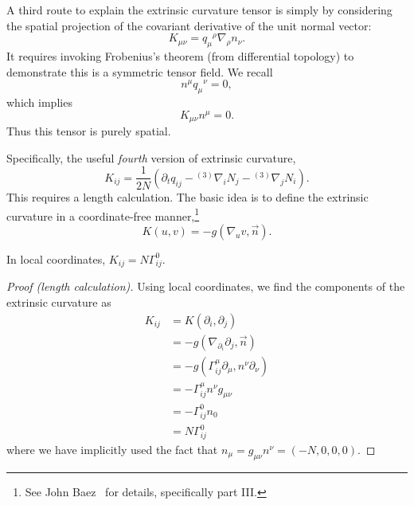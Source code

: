 A third route to explain the extrinsic curvature tensor is simply by
considering the spatial projection of the covariant derivative of the unit
normal vector:
\begin{equation}
K_{\mu\nu} = {q_{\mu}}^{\rho}\nabla_{\rho}n_{\nu}.
\end{equation}
It requires invoking Frobenius's theorem (from differential topology) to
demonstrate this is a symmetric tensor field. We recall
\begin{equation}
n^{\mu}{q_{\mu}}^{\nu} = 0,
\end{equation}
which implies
\begin{equation}
K_{\mu\nu}n^{\mu} = 0.
\end{equation}
Thus this tensor is purely spatial.

Specifically, the useful \emph{fourth} version of extrinsic curvature,
\begin{equation}\label{eq:extrinsic-curvature:as-time-derivative-of-three-metric}
K_{ij} = \frac{1}{2N}(\partial_{t}q_{ij} - {{}^{(3)}}\nabla_{i}N_{j} - {{}^{(3)}}\nabla_{j}N_{i}).
\end{equation}
This requires a length calculation. The basic idea is to define the
extrinsic curvature in a coordinate-free manner,\footnote{See John
Baez~\cite{baez} for details, specifically part III.}
\begin{equation}
K(u,v) = -g(\nabla_{u}v,\vec{n}).
\end{equation}

\begin{lemma}
In local coordinates, $K_{ij} = N\Gamma^{0}_{ij}$.
\end{lemma}
\begin{proof}[Proof (length calculation)]
Using local coordinates, we find the components of the extrinsic curvature as
\begin{subequations}
  \begin{align}
    K_{ij} &= K(\partial_{i}, \partial_{j})\\
    &= -g(\nabla_{\partial_{i}}\partial_{j}, \vec{n})\\
    &= -g(\Gamma^{\mu}_{ij}\partial_{\mu}, n^{\nu}\partial_{\nu})\\
    &= -\Gamma^{\mu}_{ij}n^{\nu}g_{\mu\nu}\\
    &= -\Gamma^{0}_{ij}n_{0}\\
    &= N\Gamma^{0}_{ij}
  \end{align}
\end{subequations}
where we have implicitly used the fact that
$n_{\mu}=g_{\mu\nu}n^{\nu}=(-N,0,0,0)$.
\end{proof}


